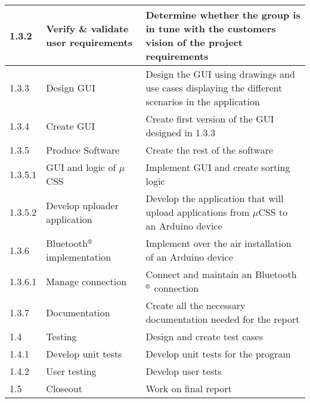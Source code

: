\begin{longtable}{|m{}|m{}|m{}|}
\hline
	 1.3.2 & Verify \& validate user requirements & Determine whether the group is in tune with the customers vision of the project requirements \\
\hline
	 1.3.3 & Design GUI & Design the GUI using drawings and use cases displaying the different scenarios in the application\\
\hline	
	 1.3.4 & Create GUI & Create first version of the GUI designed in 1.3.3 \\
\hline
	 1.3.5 & Produce Software & Create the rest of the software \\
\hline
	1.3.5.1 & GUI and logic of $\mu$CSS & Implement GUI and create sorting logic \\
\hline
	 1.3.5.2 & Develop uploader application & Develop the application that will upload applications from $\mu$CSS to an Arduino device \\
\hline
	1.3.6 & Bluetooth$\textsuperscript{\textregistered}$ implementation & Implement over the air installation of an Arduino device \\
\hline
	1.3.6.1 & Manage connection & Connect and maintain an Bluetooth$\textsuperscript{\textregistered}$ connection \\
\hline
	1.3.7 & Documentation & Create all the necessary documentation needed for the report \\
\hline
	1.4 & Testing & Design and create test cases\\
\hline
	1.4.1 & Develop unit tests & Develop unit tests for the program\\
\hline
	 1.4.2 & User testing & Develop user tests\\
\hline
	1.5 & Closeout & Work on final report\\
\hline
\end{longtable}